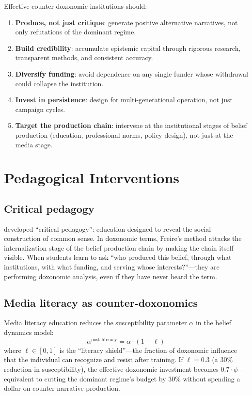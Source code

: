 \begin{model}
\label{mod:counter-institution}
Effective counter-doxonomic institutions should:
\begin{enumerate}[nosep]
  \item \textbf{Produce, not just critique}: generate positive alternative narratives, not only refutations of the dominant regime.
  \item \textbf{Build credibility}: accumulate epistemic capital through rigorous research, transparent methods, and consistent accuracy.
  \item \textbf{Diversify funding}: avoid dependence on any single funder whose withdrawal could collapse the institution.
  \item \textbf{Invest in persistence}: design for multi-generational operation, not just campaign cycles.
  \item \textbf{Target the production chain}: intervene at the institutional stages of belief production (education, professional norms, policy design), not just at the media stage.
\end{enumerate}
\end{model}

\section{Pedagogical Interventions}
\label{sec:ch31-pedagogy}

\subsection{Critical pedagogy}

\textcite{freire1968} developed ``critical pedagogy'': education designed to reveal the social construction of common sense.
In doxonomic terms, Freire's method attacks the internalization stage of the belief production chain by making the chain itself visible.
When students learn to ask ``who produced this belief, through what institutions, with what funding, and serving whose interests?''---they are performing doxonomic analysis, even if they have never heard the term.

\subsection{Media literacy as counter-doxonomics}

\begin{model}
\label{mod:media-literacy}
Media literacy education reduces the susceptibility parameter $\alpha$ in the belief dynamics model:
\[
  \alpha^{\text{post-literacy}} = \alpha \cdot (1 - \ell)
\]
where $\ell \in [0, 1]$ is the ``literacy shield''---the fraction of doxonomic influence that the individual can recognize and resist after training.
If $\ell = 0.3$ (a 30\% reduction in susceptibility), the effective doxonomic investment becomes $0.7 \cdot \phi$---equivalent to cutting the dominant regime's budget by 30\% without spending a dollar on counter-narrative production.
\end{model}

